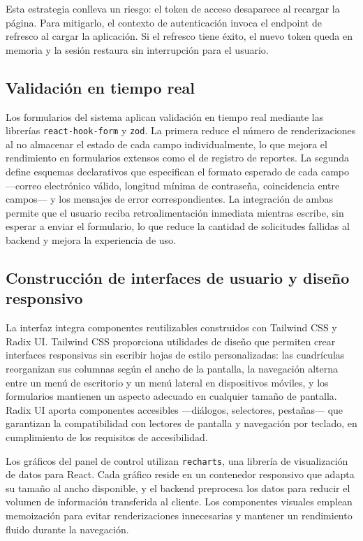 Esta estrategia conlleva un riesgo: el token de acceso desaparece al recargar la página.
Para mitigarlo, el contexto de autenticación invoca el endpoint de refresco al cargar la aplicación. 
Si el refresco tiene éxito, el nuevo token queda en memoria y la sesión restaura sin interrupción para el usuario.

\subsection{Validación en tiempo real}

Los formularios del sistema aplican validación en tiempo real mediante las librerías \texttt{react-hook-form} y \texttt{zod}. La primera reduce el número de renderizaciones al no almacenar el estado de cada campo individualmente, lo que mejora el rendimiento en formularios extensos como el de registro de reportes. La segunda define esquemas declarativos que especifican el formato esperado de cada campo —correo electrónico válido, longitud mínima de contraseña, coincidencia entre campos— y los mensajes de error correspondientes. La integración de ambas permite que el usuario reciba retroalimentación inmediata mientras escribe, sin esperar a enviar el formulario, lo que reduce la cantidad de solicitudes fallidas al backend y mejora la experiencia de uso.

\subsection{Construcción de interfaces de usuario y diseño responsivo}

La interfaz integra componentes reutilizables construidos con Tailwind CSS y Radix UI. 
Tailwind CSS proporciona utilidades de diseño que permiten crear interfaces responsivas sin escribir hojas de estilo personalizadas: las cuadrículas reorganizan sus columnas según el ancho de la pantalla, la navegación alterna entre un menú de escritorio y un menú lateral en dispositivos móviles, y los formularios mantienen un aspecto adecuado en cualquier tamaño de pantalla. 
Radix UI aporta componentes accesibles —diálogos, selectores, pestañas— que garantizan la compatibilidad con lectores de pantalla y navegación por teclado, en cumplimiento de los requisitos de accesibilidad.

Los gráficos del panel de control utilizan \texttt{recharts}, una librería de visualización de datos para React. 
Cada gráfico reside en un contenedor responsivo que adapta su tamaño al ancho disponible, y el backend preprocesa los datos para reducir el volumen de información transferida al cliente.
Los componentes visuales emplean memoización para evitar renderizaciones innecesarias y mantener un rendimiento fluido durante la navegación.

